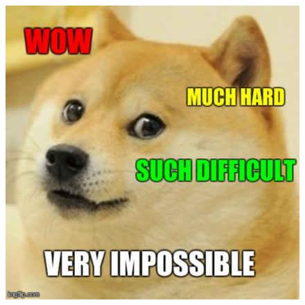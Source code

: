 \begin{figure}[hbtp]
        \centering
        \includegraphics[scale=0.43]{doge.pdf}
        \end{figure}